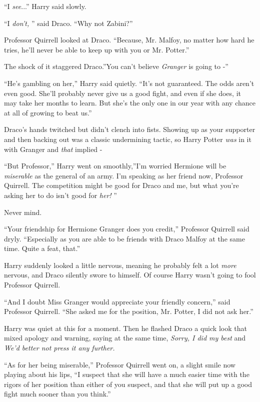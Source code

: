 ``I \emph{see}...'' Harry said slowly.

``I \emph{don't,} '' said Draco. ``Why not Zabini?''

Professor Quirrell looked at Draco. ``Because, Mr. Malfoy, no matter how
hard he tries, he'll never be able to keep up with you or Mr. Potter.''

The shock of it staggered Draco.''You can't believe \emph{Granger} is
going to -''

``He's gambling on her,'' Harry said quietly. ``It's not guaranteed. The
odds aren't even good. She'll probably never give us a good fight, and
even if she does, it may take her months to learn. But she's the only
one in our year with any chance at all of growing to beat us.''

Draco's hands twitched but didn't clench into fists. Showing up as your
supporter and then backing out was a classic undermining tactic, so
Harry Potter \emph{was} in it with Granger and \emph{that} implied -

``But Professor,'' Harry went on smoothly,''I'm worried Hermione will be
\emph{miserable} as the general of an army. I'm speaking as her friend
now, Professor Quirrell. The competition might be good for Draco and me,
but what you're asking her to do isn't good for \emph{her!} ''

Never mind.

``Your friendship for Hermione Granger does you credit,'' Professor
Quirrell said dryly. ``Especially as you are able to be friends with
Draco Malfoy at the same time. Quite a feat, that.''

Harry suddenly looked a little nervous, meaning he probably felt a lot
\emph{more} nervous, and Draco silently swore to himself. Of course
Harry wasn't going to fool Professor Quirrell.

``And I doubt Miss Granger would appreciate your friendly concern,''
said Professor Quirrell. ``She asked me for the position, Mr. Potter, I
did not ask her.''

Harry was quiet at this for a moment. Then he flashed Draco a quick look
that mixed apology and warning, saying at the same time, \emph{Sorry, I
did my best} and \emph{We'd better not press it any further.}

``As for her being miserable,'' Professor Quirrell went on, a slight
smile now playing about his lips, ``I suspect that she will have a much
easier time with the rigors of her position than either of you suspect,
and that she will put up a good fight much sooner than you think.''


